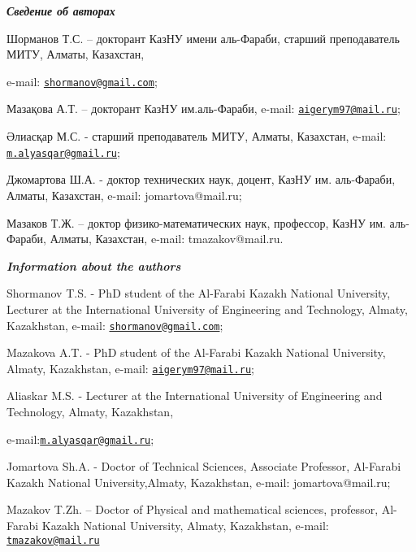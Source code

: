 \begin{authorinfo}
\hspace{1em}\emph{{\bfseries Сведение об авторах}}

Шорманов Т.С. -- докторант КазНУ имени аль-Фараби, старший преподаватель
МИТУ, Алматы, Казахстан,

e-mail: \href{mailto:shormanov@gmail.com}{\nolinkurl{shormanov@gmail.com}};

Мазақова А.Т. -- докторант КазНУ им.аль-Фараби, e-mail:
\href{mailto:aigerym97@mail.ru}{\nolinkurl{aigerym97@mail.ru}};

Әлиасқар М.С. - старший преподаватель МИТУ, Алматы, Казахстан, e-mail:
\href{mailto:m.alyasqar@gmail.ru}{\nolinkurl{m.alyasqar@gmail.ru}};

Джомартова Ш.А. - доктор технических наук, доцент, КазНУ им. аль-Фараби,
Алматы, Казахстан, e-mail: jomartova@mail.ru;

Мазаков Т.Ж. -- доктор физико-математических наук, профессор, КазНУ им.
аль-Фараби, Алматы, Казахстан, e-mail: tmazakov@mail.ru.

\hspace{1em}\emph{{\bfseries Information about the authors}}

Shormanov T.S. - PhD student of the Al-Farabi Kazakh National
University, Lecturer at the International University of Engineering and
Technology, Almaty, Kazakhstan, e-mail:
\href{mailto:shormanov@gmail.com}{\nolinkurl{shormanov@gmail.com}};

Mazakova A.T. - PhD student of the Al-Farabi Kazakh National University,
Almaty, Kazakhstan, e-mail:
\href{mailto:aigerym97@mail.ru}{\nolinkurl{aigerym97@mail.ru}};

Aliaskar M.S. - Lecturer at the International University of Engineering
and Technology, Almaty, Kazakhstan, 

e-mail:\href{mailto:m.alyasqar@gmail.ru}{\nolinkurl{m.alyasqar@gmail.ru}};

Jomartova Sh.A. - Doctor of Technical Sciences, Associate Professor,
Al-Farabi Kazakh National University,Almaty, Kazakhstan, e-mail:
jomartova@mail.ru;

Mazakov T.Zh. -- Doctor of Physical and mathematical sciences,
professor, Al-Farabi Kazakh National University, Almaty, Kazakhstan,
e-mail: \href{mailto:tmazakov@mail.ru}{\nolinkurl{tmazakov@mail.ru}}
\end{authorinfo}
